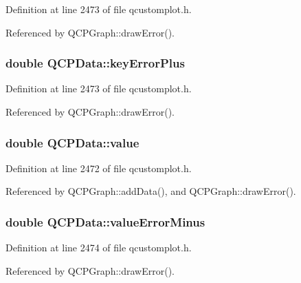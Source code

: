 Definition at line 2473 of file qcustomplot.\+h.



Referenced by Q\+C\+P\+Graph\+::draw\+Error().

\hypertarget{class_q_c_p_data_ae468c3808107c2fd23052481156ab5b5}{}
\subsubsection[{key\+Error\+Plus}]{\setlength{\rightskip}{0pt plus 5cm}double Q\+C\+P\+Data\+::key\+Error\+Plus}\label{class_q_c_p_data_ae468c3808107c2fd23052481156ab5b5}


Definition at line 2473 of file qcustomplot.\+h.



Referenced by Q\+C\+P\+Graph\+::draw\+Error().

\hypertarget{class_q_c_p_data_aefe1ecf8fa2e34ed875b67523e542373}{}
\subsubsection[{value}]{\setlength{\rightskip}{0pt plus 5cm}double Q\+C\+P\+Data\+::value}\label{class_q_c_p_data_aefe1ecf8fa2e34ed875b67523e542373}


Definition at line 2472 of file qcustomplot.\+h.



Referenced by Q\+C\+P\+Graph\+::add\+Data(), and Q\+C\+P\+Graph\+::draw\+Error().

\hypertarget{class_q_c_p_data_a51d8f42bf4d49a1f263531e70cadd6a3}{}
\subsubsection[{value\+Error\+Minus}]{\setlength{\rightskip}{0pt plus 5cm}double Q\+C\+P\+Data\+::value\+Error\+Minus}\label{class_q_c_p_data_a51d8f42bf4d49a1f263531e70cadd6a3}


Definition at line 2474 of file qcustomplot.\+h.



Referenced by Q\+C\+P\+Graph\+::draw\+Error().

